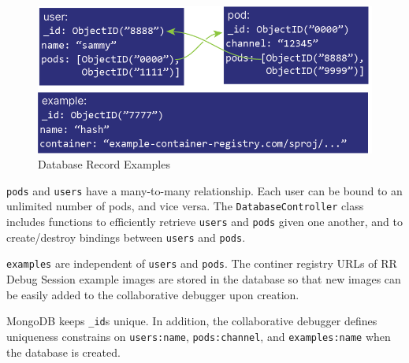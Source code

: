 \documentclass[12pt]{article}
\begin{document}
\begin{figure}[h!]

  \includegraphics[scale=1]{database_example}
  \centering
  \caption{Database Record Examples}
  \label{rr:detailed}
\end{figure}

\lstinline{pods} and \lstinline{users} have a many-to-many
relationship.  Each user can be bound to an unlimited number of pods,
and vice versa.  The \lstinline{DatabaseController} class includes
functions to efficiently retrieve \lstinline{users} and
\lstinline{pods} given one another, and to create/destroy bindings
between \lstinline{users} and \lstinline{pods}.
\par

\lstinline{examples} are independent of \lstinline{users} and
\lstinline{pods}.  The continer registry URLs of RR Debug Session
example images are stored in the database so that new images can be
easily added to the collaborative debugger upon creation.
\par

MongoDB keeps \lstinline{_id}s unique.  In addition, the collaborative
debugger defines uniqueness constrains on \lstinline{users:name},
\lstinline{pods:channel}, and \lstinline{examples:name} when the
database is created.


\end{document}

